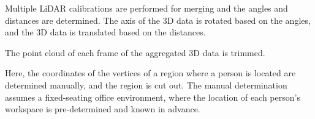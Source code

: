   \begin{deletedblock}
  Multiple LiDAR calibrations are performed for merging and the angles and distances are determined. 
    The axis of the 3D data is rotated based on the angles, and the 3D data is translated based on the distances.
  \end{deletedblock}

The point cloud of each frame of the aggregated 3D data is trimmed.
  \begin{deletedblock}
  Here, the coordinates of the vertices of a region where a person is located are determined manually, and the region is cut out. 
    The manual determination assumes a fixed-seating office environment, where the location of each person's workspace is pre-determined and known in advance.
  \end{deletedblock}


